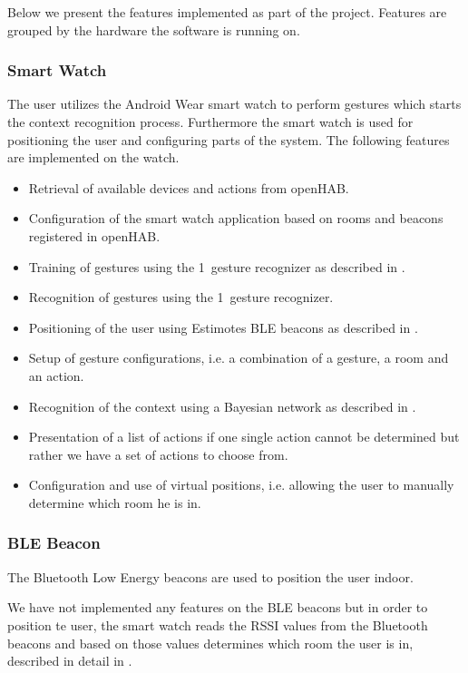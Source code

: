 Below we present the features implemented as part of the project. Features are grouped by the hardware the software is running on.

\subsubsection{Smart Watch}

The user utilizes the Android Wear smart watch to perform gestures which starts the context recognition process. Furthermore the smart watch is used for positioning the user and configuring parts of the system. The following features are implemented on the watch.

\begin{itemize}
\item Retrieval of available devices and actions from openHAB.
\item Configuration of the smart watch application based on rooms and beacons registered in openHAB.
\item Training of gestures using the 1\textcent~gesture recognizer as described in .
\item Recognition of gestures using the 1\textcent~gesture recognizer.
\item Positioning of the user using Estimotes BLE beacons as described in .
\item Setup of gesture configurations, i.e. a combination of a gesture, a room and an action.
\item Recognition of the context using a Bayesian network as described in .
\item Presentation of a list of actions if one single action cannot be determined but rather we have a set of actions to choose from.
\item Configuration and use of virtual positions, i.e. allowing the user to manually determine which room he is in.
\end{itemize}

\subsubsection{BLE Beacon}

The Bluetooth Low Energy beacons are used to position the user indoor.

We have not implemented any features on the BLE beacons but in order to position te user, the smart watch reads the RSSI values from the Bluetooth beacons and based on those values determines which room the user is in, described in detail in .

